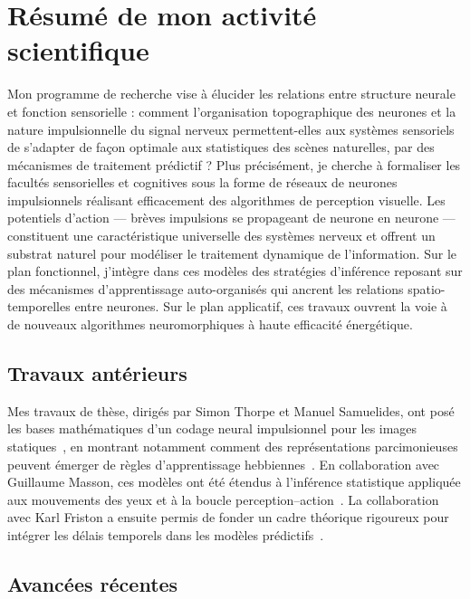 \documentclass[10pt,french,a4paper]{article}%
\begin{document}
\newpage


\section{Résumé de mon activité scientifique}

Mon programme de recherche vise à élucider les relations entre structure neurale et fonction sensorielle : comment l'organisation topographique des neurones et la nature impulsionnelle du signal nerveux permettent-elles aux systèmes sensoriels de s'adapter de façon optimale aux statistiques des scènes naturelles, par des mécanismes de traitement prédictif ? Plus précisément, je cherche à formaliser les facultés sensorielles et cognitives sous la forme de réseaux de neurones impulsionnels réalisant efficacement des algorithmes de perception visuelle. Les potentiels d'action --- brèves impulsions se propageant de neurone en neurone --- constituent une caractéristique universelle des systèmes nerveux et offrent un substrat naturel pour modéliser le traitement dynamique de l'information. Sur le plan fonctionnel, j'intègre dans ces modèles des stratégies d'inférence reposant sur des mécanismes d'apprentissage auto-organisés qui ancrent les relations spatio-temporelles entre neurones. Sur le plan applicatif, ces travaux ouvrent la voie à de nouveaux algorithmes neuromorphiques à haute efficacité énergétique.

\subsection*{Travaux antérieurs}

Mes travaux de thèse, dirigés par Simon Thorpe et Manuel Samuelides, ont posé les bases mathématiques d'un codage neural impulsionnel pour les images statiques~\citep{Perrinet03ieee}, en montrant notamment comment des représentations parcimonieuses peuvent émerger de règles d'apprentissage hebbiennes~\citep{Perrinet10shl}. En collaboration avec Guillaume Masson, ces modèles ont été étendus à l'inférence statistique appliquée aux mouvements des yeux et à la boucle perception--action~\citep{Simoncini12}. La collaboration avec Karl Friston a ensuite permis de fonder un cadre théorique rigoureux pour intégrer les délais temporels dans les modèles prédictifs~\citep{PerrinetAdamsFriston14}.

\subsection*{Avancées récentes}
\end{document}
